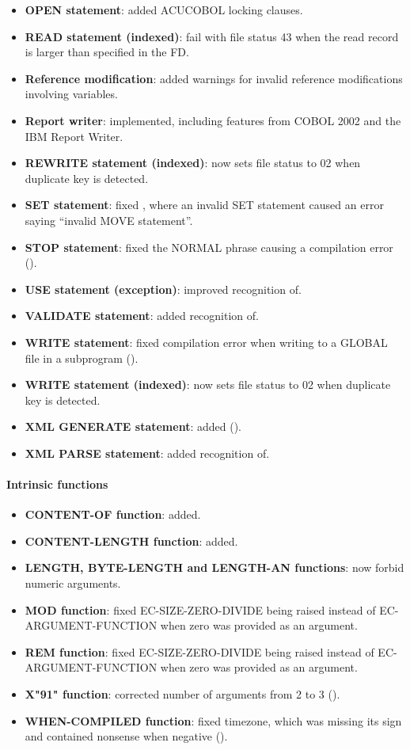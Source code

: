 \begin{itemize}
\item \textbf{OPEN statement}: added ACUCOBOL locking clauses.
\item \textbf{READ statement (indexed)}: fail with file status 43 when the read record is larger than specified in the FD.
\item \textbf{Reference modification}: added warnings for invalid reference modifications involving variables.
\item \textbf{Report writer}: implemented, including features from COBOL 2002 and the IBM Report Writer.
\item \textbf{REWRITE statement (indexed)}: now sets file status to 02 when duplicate key is detected.
\item \textbf{SET statement}: fixed , where an invalid SET statement caused an error saying ``invalid MOVE statement''.
\item \textbf{STOP statement}: fixed the NORMAL phrase causing a compilation error ().
\item \textbf{USE statement (exception)}: improved recognition of.
\item \textbf{VALIDATE statement}: added recognition of.
\item \textbf{WRITE statement}: fixed compilation error when writing to a GLOBAL file in a subprogram ().
\item \textbf{WRITE statement (indexed)}: now sets file status to 02 when duplicate key is detected.
\item \textbf{XML GENERATE statement}: added ().
\item \textbf{XML PARSE statement}: added recognition of.
\end{itemize}

\paragraph{Intrinsic functions}
\begin{itemize}
\item \textbf{CONTENT-OF function}: added.
\item \textbf{CONTENT-LENGTH function}: added.
\item \textbf{LENGTH, BYTE-LENGTH and LENGTH-AN functions}: now forbid numeric arguments.
\item \textbf{MOD function}: fixed EC-SIZE-ZERO-DIVIDE being raised instead of EC-ARGUMENT-FUNCTION when zero was provided as an argument.
\item \textbf{REM function}: fixed EC-SIZE-ZERO-DIVIDE being raised instead of EC-ARGUMENT-FUNCTION when zero was provided as an argument.
\item \textbf{X"91" function}: corrected number of arguments from 2 to 3 ().
\item \textbf{WHEN-COMPILED function}: fixed timezone, which was missing its sign and contained nonsense when negative ().
\end{itemize}

